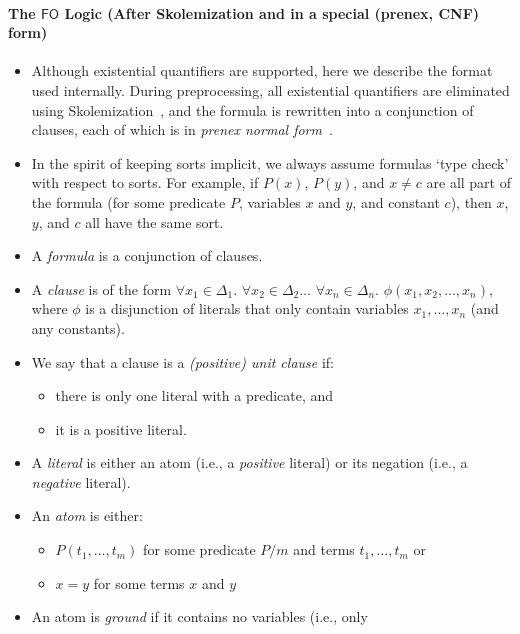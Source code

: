 \documentclass{article}
\theoremstyle{definition}
\newcommand{\FO}{$\mathsf{FO}$}
\begin{document}
\paragraph{The \FO{} Logic (After Skolemization and in a special (prenex, CNF)
  form)}
\begin{itemize}
  \item Although existential quantifiers are supported, here we describe the
        format used internally. During preprocessing, all existential
        quantifiers are eliminated using
        Skolemization~\cite{DBLP:conf/kr/BroeckMD14}, and the formula is
        rewritten into a conjunction of clauses, each of which is in
        \emph{prenex normal form}~\cite{hinman2018fundamentals}.
  \item In the spirit of keeping sorts implicit, we always assume formulas `type
        check' with respect to sorts. For example, if $P(x)$, $P(y)$, and
        $x \ne c$ are all part of the formula (for some predicate $P$, variables
        $x$ and $y$, and constant $c$), then $x$, $y$, and $c$ all have the same
        sort.
  \item A \emph{formula} is a conjunction of clauses.
  \item A \emph{clause} is of the form $\forall x_{1} \in \Delta_{1}\text{.
        }\forall x_{2} \in \Delta_{2}\dots\text{
        }\forall x_{n} \in \Delta_{n}\text{. }\phi(x_{1}, x_{2}, \dots, x_{n})$,
        where $\phi$ is a disjunction of literals that only contain variables
        $x_{1}, \dots, x_{n}$ (and any constants).
  \item We say that a clause is a \emph{(positive) unit clause} if:
        \begin{itemize}
          \item there is only one literal with a predicate, and
          \item it is a positive literal.
        \end{itemize}
  \item A \emph{literal} is either an atom (i.e., a \emph{positive} literal) or
        its negation (i.e., a \emph{negative} literal).
  \item An \emph{atom} is either:
  \begin{itemize}
    \item $P(t_{1}, \dots, t_{m})$ for some predicate $P/m$ and terms
          $t_{1}, \dots, t_{m}$ or
    \item $x=y$ for some terms $x$ and $y$
  \end{itemize}
  \item An atom is \emph{ground} if it contains no variables (i.e., only

\end{itemize}
\end{document}
